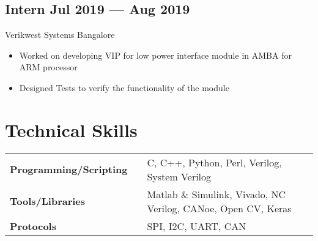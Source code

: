 \documentclass[a4,10pt]{article}
\newcommand{\subtext}[1]{
#1\par\vspace{-0.2cm}}
\newenvironment{zitemize}{
\begin{itemize}\itemsep0pt \parskip0pt \parsep1pt}
{\end{itemize}\vspace{-0.5cm}}
\newcommand{\hskills}[1]{
\textbf{\bfseries #1} }
\begin{document}
\subsection*{Intern \hfill Jul 2019 --- Aug 2019} 
\subtext{Verikwest Systems  \hfill Bangalore} 
    \begin{zitemize}
        \item Worked on developing VIP for low power interface module in AMBA for ARM processor
        \item Designed Tests to verify the functionality of the module
        
    \end{zitemize}





\section{Technical Skills}
\begin{tabular}{p{11em} p{1em} p{43em}}
\hskills{Programming/Scripting }&  &  C, C++, Python, Perl, Verilog, System Verilog \\
\hskills{Tools/Libraries} &  & Matlab \& Simulink, Vivado, NC Verilog, CANoe, Open CV, Keras \\
\hskills{Protocols} &  & SPI, I2C, UART, CAN \\
\end{tabular}
\vspace{-0.2cm}




\end{document}

